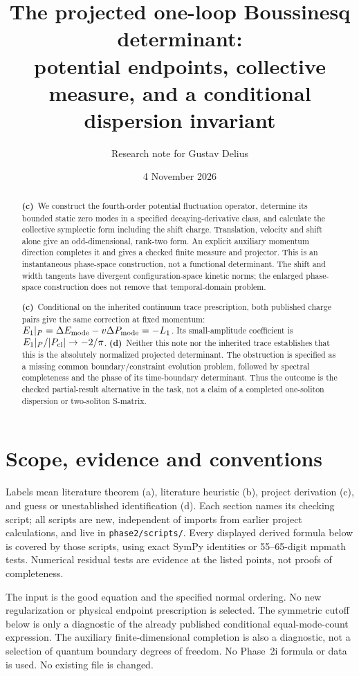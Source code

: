 \documentclass[11pt,a4paper]{article}
\title{The projected one-loop Boussinesq determinant:\\
potential endpoints, collective measure, and a conditional dispersion invariant}
\author{Research note for Gustav Delius}
\date{4 November 2026}
\newcommand{\Lc}{\textbf{(c)}}
\newcommand{\Ld}{\textbf{(d)}}
\begin{document}
\maketitle
\begin{abstract}
\Lc\ We construct the fourth-order potential fluctuation operator, determine
its bounded static zero modes in a specified decaying-derivative class, and
calculate the collective symplectic form including the shift charge. Translation,
velocity and shift alone give an odd-dimensional, rank-two form. An explicit
auxiliary momentum direction completes it and gives a checked finite measure
and projector. This is an instantaneous phase-space construction, not a
functional determinant. The shift and width tangents have divergent
configuration-space kinetic norms; the enlarged phase-space construction does
not remove that temporal-domain problem.

\Lc\ Conditional on the inherited continuum trace prescription, both published
charge pairs give the same correction at fixed momentum:
$E_1|_P=\Delta E_{\rm mode}-v\Delta P_{\rm mode}=-L_1$.
Its small-amplitude coefficient is $E_1|_P/|P_{\rm cl}|\to-2/\pi$.
\Ld\ Neither this note nor the inherited trace establishes that this is the
absolutely normalized projected determinant. The obstruction is specified as
a missing common boundary/constraint evolution problem, followed by spectral
completeness and the phase of its time-boundary determinant. Thus the outcome
is the checked partial-result alternative in the task, not a claim of a
completed one-soliton dispersion or two-soliton S-matrix.
\end{abstract}

\section{Scope, evidence and conventions}
Labels mean literature theorem (a), literature heuristic (b), project
derivation (c), and guess or unestablished identification (d).
Each section names its checking script; all scripts are new, independent of
imports from earlier project calculations, and live in \texttt{phase2/scripts/}.
Every displayed derived formula below is covered by those scripts, using
exact SymPy identities or 55--65-digit mpmath tests. Numerical residual tests
are evidence at the listed points, not proofs of completeness.

The input is the good equation and the specified normal ordering. No new
regularization or physical endpoint prescription is selected. The symmetric
cutoff below is only a diagnostic of the already published conditional
equal-mode-count expression. The auxiliary finite-dimensional completion is
also a diagnostic, not a selection of quantum boundary degrees of freedom.
No Phase~2i formula or data is used. No existing file is changed.
\end{document}

